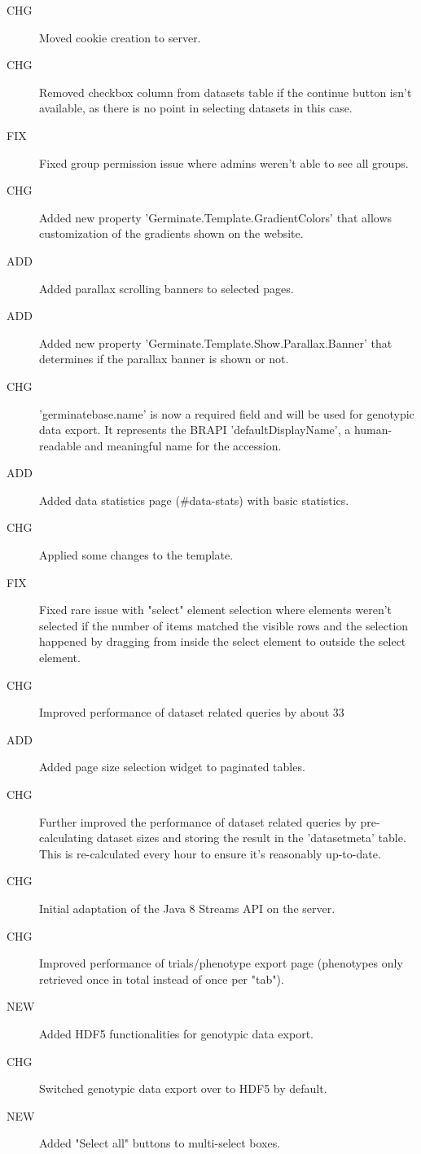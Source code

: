 \begin{description}
	\item[CHG] Moved cookie creation to server.
	\item[CHG] Removed checkbox column from datasets table if the continue button isn't available, as there is no point in selecting datasets in this case.
	\item[FIX] Fixed group permission issue where admins weren't able to see all groups.
	\item[CHG] Added new property 'Germinate.Template.GradientColors' that allows customization of the gradients shown on the website.
	\item[ADD] Added parallax scrolling banners to selected pages.
	\item[ADD] Added new property 'Germinate.Template.Show.Parallax.Banner' that determines if the parallax banner is shown or not.
	\item[CHG] 'germinatebase.name' is now a required field and will be used for genotypic data export. It represents the BRAPI 'defaultDisplayName', a human-readable and meaningful name for the accession.
	\item[ADD] Added data statistics page (\#data-stats) with basic statistics.
	\item[CHG] Applied some changes to the template.
	\item[FIX] Fixed rare issue with "select" element selection where elements weren't selected if the number of items matched the visible rows and the selection happened by dragging from inside the select element to outside the select element.
	\item[CHG] Improved performance of dataset related queries by about 33%
	\item[ADD] Added page size selection widget to paginated tables.
	\item[CHG] Further improved the performance of dataset related queries by pre-calculating dataset sizes and storing the result in the 'datasetmeta' table. This is re-calculated every hour to ensure it's reasonably up-to-date.
	\item[CHG] Initial adaptation of the Java 8 Streams API on the server.
	\item[CHG] Improved performance of trials/phenotype export page (phenotypes only retrieved once in total instead of once per "tab").
	\item[NEW] Added HDF5 functionalities for genotypic data export.
	\item[CHG] Switched genotypic data export over to HDF5 by default.
	\item[NEW] Added "Select all" buttons to multi-select boxes.

\end{description}
